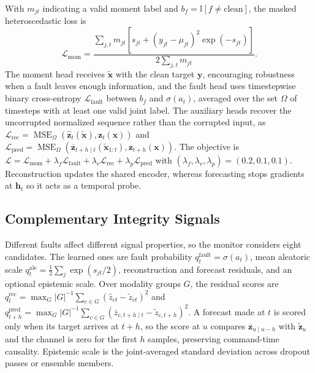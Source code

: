 \documentclass[letterpaper]{article} %
\begin{document}
With $m_{jt}$ indicating a valid moment label and $b_f=\mathbb{I}[f\neq\mathrm{clean}]$, the masked heteroscedastic loss is
\begin{equation}
\mathcal{L}_{\mathrm{mom}}
=\frac{\sum_{j,t}m_{jt}\left[s_{jt}+(y_{jt}-\mu_{jt})^2\exp(-s_{jt})\right]}{2\sum_{j,t}m_{jt}}.
\end{equation}
The moment head receives $\widetilde{\mathbf{x}}$ with the clean target $\mathbf{y}$, encouraging robustness when a fault leaves enough information, and the fault head uses timestepwise binary cross-entropy $\mathcal{L}_{\mathrm{fault}}$ between $b_f$ and $\sigma(a_t)$, averaged over the set $\Omega$ of timesteps with at least one valid joint label.
The auxiliary heads recover the uncorrupted normalized sequence rather than the corrupted input, as $\mathcal{L}_{\mathrm{rec}}=\operatorname{MSE}_{\Omega}(\widehat{\mathbf{z}}_t(\widetilde{\mathbf{x}}),\mathbf{z}_t(\mathbf{x}))$ and $\mathcal{L}_{\mathrm{pred}}=\operatorname{MSE}_{\Omega}(\overline{\mathbf{z}}_{t+h\mid t}(\widetilde{\mathbf{x}}_{1:t}),\mathbf{z}_{t+h}(\mathbf{x}))$.
The objective is $\mathcal{L}=\mathcal{L}_{\mathrm{mom}}+\lambda_f\mathcal{L}_{\mathrm{fault}}+\lambda_r\mathcal{L}_{\mathrm{rec}}+\lambda_p\mathcal{L}_{\mathrm{pred}}$ with $(\lambda_f,\lambda_r,\lambda_p)=(0.2,0.1,0.1)$.
Reconstruction updates the shared encoder, whereas forecasting stops gradients at $\mathbf{h}_t$ so it acts as a temporal probe.

\subsection{Complementary Integrity Signals}

Different faults affect different signal properties, so the monitor considers eight candidates. The learned ones are fault probability $q_t^{\mathrm{fault}}=\sigma(a_t)$, mean aleatoric scale $q_t^{\mathrm{ale}}=\frac{1}{2}\sum_j\exp(s_{jt}/2)$, reconstruction and forecast residuals, and an optional epistemic scale.
Over modality groups $G$, the residual scores are $q_t^{\mathrm{rec}}=\max_G|G|^{-1}\sum_{c\in G}(\widehat z_{ct}-\widetilde z_{ct})^2$ and $q_{t+h}^{\mathrm{pred}}=\max_G|G|^{-1}\sum_{c\in G}(\overline z_{c,t+h\mid t}-\widetilde z_{c,t+h})^2$.
A forecast made at $t$ is scored only when its target arrives at $t+h$, so the score at $u$ compares $\overline{\mathbf{z}}_{u\mid u-h}$ with $\widetilde{\mathbf{z}}_u$ and the channel is zero for the first $h$ samples, preserving command-time causality. Epistemic scale is the joint-averaged standard deviation across dropout passes or ensemble members.
\end{document}
